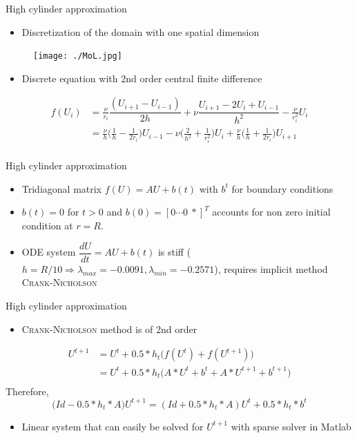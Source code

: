\documentclass{beamer}
\begin{document}
\begin{frame}{High cylinder approximation}
\begin{itemize}
\item Discretization of the domain with one spatial dimension
\end{itemize}
\begin{figure}[!h]
\centering
\texttt{[image: ./MoL.jpg]}
\end{figure}

\begin{itemize}
\item Discrete equation with 2nd order central finite difference
\end{itemize}
\begin{align*}
f(U_i ) &= \frac{\nu}{r_i}\dfrac{(U_{i+1}-U_{i-1})}{2h}+\nu\dfrac{U_{i+1}-2U_{i}+U_{i-1}}{h^{2}} -\frac{\nu}{r_{i}^2}U_{i}\\
&= \frac{\nu}{h}\Big( \frac{1}{h} - \frac{1}{2r_i}\Big)U_{i-1} 
 -\nu\Big( \frac{2}{h^2} + \frac{1}{r_{i}^{2}}\Big)U_{i}
+ \frac{\nu}{h}\Big( \frac{1}{h} + \frac{1}{2r_i}\Big)U_{i+1}\\
\end{align*} 
\end{frame}

\begin{frame}{High cylinder approximation}

\begin{itemize}
\item Tridiagonal matrix $f(U) = AU+b(t)$ with $b^t$ for boundary conditions
\item $b(t) =0$ for $t>0$ and $b(0)  = [0 \cdots 0  ~*]^{T}$ accounts for non zero initial condition at $r=R$.
\item ODE system $\dfrac{dU}{dt}=AU + b(t)$ is stiff ($h=R/10 \Longrightarrow \lambda_{max} = -0.0091, \lambda_{min}=-0.2571$), requires implicit method \textsc{Crank-Nicholson}
\end{itemize}
\end{frame}


\begin{frame}{High cylinder approximation}
\begin{itemize}
\item \textsc{Crank-Nicholson} method is of 2nd order
\end{itemize}
\begin{align*}
U^{t+1} &= U^{t} + 0.5*h_{t}\Big(f(U^{t}) + f(U^{t+1})\Big)\\
  &= U^{t} + 0.5*h_{t}\Big(A*U^{t}+b^t + A*U^{t+1} + b^{t+1}\Big)\\
\end{align*}
Therefore,
$$\Big(Id -0.5*h_{t}*A\big)U^{t+1} = (Id + 0.5*h_{t}*A)U^{t}+0.5*h_{t}*b^t$$
\begin{itemize}
\item Linear system that can easily be solved for $U^{t+1}$ with sparse solver in Matlab
\end{itemize}
\end{frame}
\end{document}
